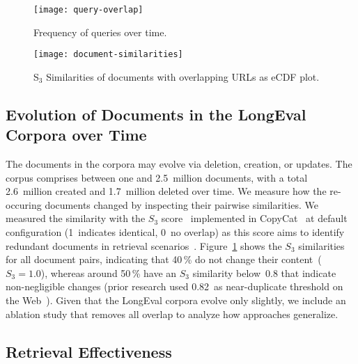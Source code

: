 \begin{figure}[t]
    \begin{minipage}{.49\textwidth}
        \texttt{[image: query-overlap]}
        \vspace{-4ex}
        \caption{Frequency of queries over time.}
        \label{fig:query-overlap}
    \end{minipage}
    \hfill    
    \begin{minipage}{.49\textwidth}
        \texttt{[image: document-similarities]}
        \vspace{-4ex}
        \caption{S$_{3}$ Similarities of documents with overlapping URLs as eCDF plot.}
        \label{fig:document-similarities}
    \end{minipage}
\end{figure}

\subsection{Evolution of Documents in the LongEval Corpora over Time}

The documents in the corpora may evolve via deletion, creation, or updates. The corpus comprises between one and 2.5~million documents, with a total 2.6~million created and 1.7~million deleted over time. We measure how the re-occuring documents changed by inspecting their pairwise similarities. We measured the similarity with the $S_{3}$ score~\cite{bernstein:2005} implemented in CopyCat~\cite{froebe:2021a} at default configuration (1~indicates identical, 0~no overlap) as this score aims to identify redundant documents in retrieval scenarios~\cite{bernstein:2005}. Figure~\ref{fig:document-similarities} shows the $S_{3}$ similarities for all document pairs, indicating that 40\,\% do not change their content~($S_{3}=1.0$), whereas around 50\,\% have an $S_{3}$ similarity below~0.8 that indicate non-negligible changes (prior research used 0.82~as near-duplicate threshold on the Web~\cite{froebe:2021a}). Given that the LongEval corpora evolve only slightly, we include an ablation study that removes all overlap to analyze how approaches generalize.



\subsection{Retrieval Effectiveness}



